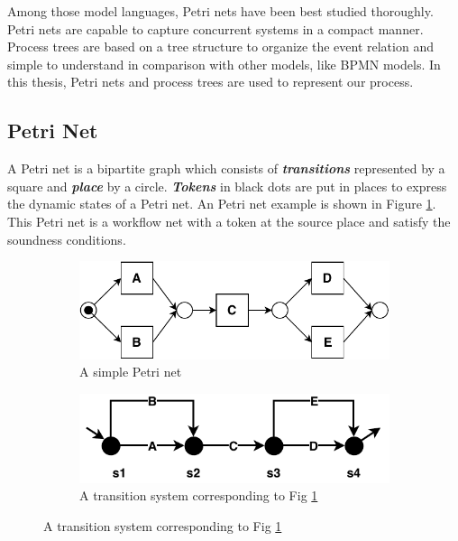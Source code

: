 Among those model languages, Petri nets have been best studied thoroughly. Petri nets are capable to capture concurrent systems in a compact manner. Process trees are based on a tree structure to organize the event relation and simple to understand in comparison with other models, like BPMN models. In this thesis, Petri nets and process trees are used to represent our process.
\subsection{Petri Net}
A Petri net is a bipartite graph which consists of \textbf{\emph{transitions}} represented by a square and \textbf{\emph{place}} by a circle. \textbf{\emph{Tokens}} in black dots are put in places to express the dynamic states of a Petri net. An Petri net example is shown in Figure \ref{fig:pn-seq-2}. This Petri net is a workflow net with a token at the source place and satisfy the soundness conditions.  
\begin{figure}[!h]
	\centering
	\begin{subfigure}[b]{0.45\textwidth}
		\centering
		\includegraphics[width=\linewidth]{figures/preliminary/simple-petrinet.pdf}
		\caption{A simple Petri net}
		\label{fig:pn-seq-2}
	\end{subfigure}%
	\quad
	\begin{subfigure}[b]{0.5\textwidth}
		\centering
		\includegraphics[width=\linewidth]{figures/preliminary/transition-system.pdf}
		\caption{A transition system corresponding to Fig \ref{fig:pn-seq-2}}
		\label{fig:ts-model}
	\end{subfigure}%
	\label{fig:pn-ts}
\end{figure}  

